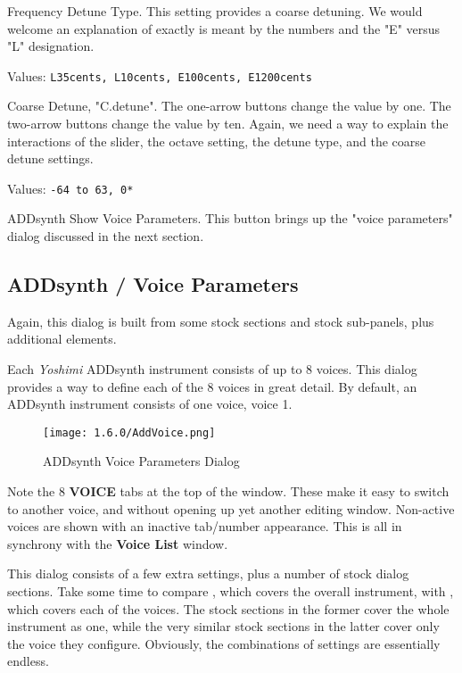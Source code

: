    Frequency Detune Type.
   This setting provides a coarse detuning.
   We would welcome an explanation of exactly is meant by the numbers and
   the "E" versus "L" designation.

   Values: \texttt{L35cents, L10cents, E100cents, E1200cents}

   Coarse Detune, "C.detune".
   The one-arrow buttons change the value by one.
   The two-arrow buttons change the value by ten.
   Again, we need a way to explain the interactions of the slider, the
   octave setting, the detune type, and the coarse detune settings.

   Values: \texttt{-64 to 63, 0*}

   ADDsynth Show Voice Parameters.
   This button brings up the "voice parameters" dialog discussed in the next
   section.

\subsection{ADDsynth / Voice Parameters}
\label{subsec:addsynth_voice_parameters}

   Again, this dialog is built from some stock sections and stock
   sub-panels, plus additional elements.

   Each \textsl{Yoshimi} ADDsynth instrument consists of up to 8 voices.
   This dialog provides a way to define each of the 8 voices in great
   detail.  By default, an ADDsynth instrument consists of one voice, voice 1.

\begin{figure}[H]
   \centering


  \texttt{[image: 1.6.0/AddVoice.png]}
   \caption{ADDsynth Voice Parameters Dialog}
   \label{fig:addsynth_voice_parameters_dialog}
\end{figure}

   Note the 8 \textbf{VOICE} tabs at the top of the window.
   These make it easy to switch to another voice, and without opening up yet
   another editing window.
   Non-active voices are shown with an inactive tab/number appearance.
   This is all in synchrony with the \textbf{Voice List} window.

   This dialog consists of a few extra settings, plus a number of
   stock dialog sections.  Take some time to compare
   ,
   which covers the overall instrument, with
   ,
   which covers each of the voices.
   The stock sections in the former cover the whole instrument as one,
   while the very similar stock sections in the latter cover only the
   voice they configure.
   Obviously, the combinations of settings are essentially endless.

